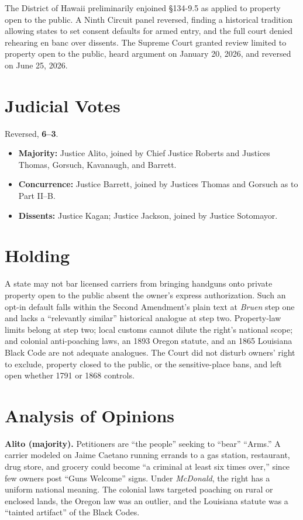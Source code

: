 \documentclass[12pt]{article}
\begin{document}
The District of Hawaii preliminarily enjoined \S{}134-9.5 as applied to property open to the public. A Ninth Circuit panel reversed, finding a historical tradition allowing states to set consent defaults for armed entry, and the full court denied rehearing en banc over dissents. The Supreme Court granted review limited to property open to the public, heard argument on January 20, 2026, and reversed on June 25, 2026.

\section{Judicial Votes}

Reversed, \textbf{6--3}.
\begin{itemize}
\item \textbf{Majority:} Justice Alito, joined by Chief Justice Roberts and Justices Thomas, Gorsuch, Kavanaugh, and Barrett.
\item \textbf{Concurrence:} Justice Barrett, joined by Justices Thomas and Gorsuch as to Part II--B.
\item \textbf{Dissents:} Justice Kagan; Justice Jackson, joined by Justice Sotomayor.
\end{itemize}

\section{Holding}

A state may not bar licensed carriers from bringing handguns onto private property open to the public absent the owner's express authorization. Such an opt-in default falls within the Second Amendment's plain text at \textit{Bruen} step one and lacks a ``relevantly similar'' historical analogue at step two. Property-law limits belong at step two; local customs cannot dilute the right's national scope; and colonial anti-poaching laws, an 1893 Oregon statute, and an 1865 Louisiana Black Code are not adequate analogues. The Court did not disturb owners' right to exclude, property closed to the public, or the sensitive-place bans, and left open whether 1791 or 1868 controls.

\section{Analysis of Opinions}

\textbf{Alito (majority).} Petitioners are ``the people'' seeking to ``bear'' ``Arms.'' A carrier modeled on Jaime Caetano running errands to a gas station, restaurant, drug store, and grocery could become ``a criminal at least six times over,'' since few owners post ``Guns Welcome'' signs. Under \textit{McDonald}, the right has a uniform national meaning. The colonial laws targeted poaching on rural or enclosed lands, the Oregon law was an outlier, and the Louisiana statute was a ``tainted artifact'' of the Black Codes.
\end{document}
